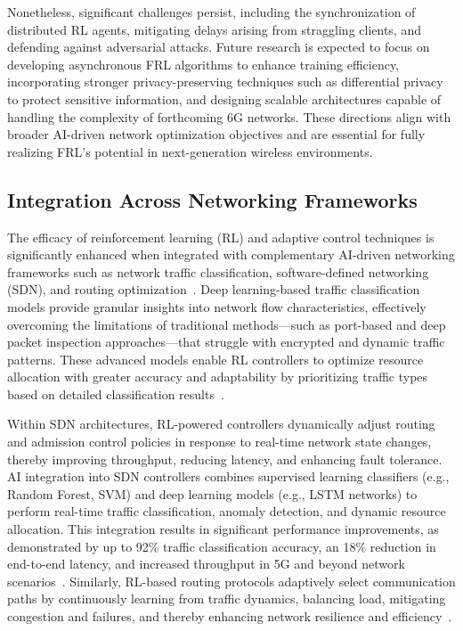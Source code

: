 \documentclass[sigconf]{acmart}
\begin{document}
Nonetheless, significant challenges persist, including the synchronization of distributed RL agents, mitigating delays arising from straggling clients, and defending against adversarial attacks. Future research is expected to focus on developing asynchronous FRL algorithms to enhance training efficiency, incorporating stronger privacy-preserving techniques such as differential privacy to protect sensitive information, and designing scalable architectures capable of handling the complexity of forthcoming 6G networks. These directions align with broader AI-driven network optimization objectives and are essential for fully realizing FRL’s potential in next-generation wireless environments.

\subsection{Integration Across Networking Frameworks}

The efficacy of reinforcement learning (RL) and adaptive control techniques is significantly enhanced when integrated with complementary AI-driven networking frameworks such as network traffic classification, software-defined networking (SDN), and routing optimization~\cite{ref51,ref52,ref53}. Deep learning-based traffic classification models provide granular insights into network flow characteristics, effectively overcoming the limitations of traditional methods—such as port-based and deep packet inspection approaches—that struggle with encrypted and dynamic traffic patterns. These advanced models enable RL controllers to optimize resource allocation with greater accuracy and adaptability by prioritizing traffic types based on detailed classification results~\cite{ref51}.

Within SDN architectures, RL-powered controllers dynamically adjust routing and admission control policies in response to real-time network state changes, thereby improving throughput, reducing latency, and enhancing fault tolerance. AI integration into SDN controllers combines supervised learning classifiers (e.g., Random Forest, SVM) and deep learning models (e.g., LSTM networks) to perform real-time traffic classification, anomaly detection, and dynamic resource allocation. This integration results in significant performance improvements, as demonstrated by up to 92\% traffic classification accuracy, an 18\% reduction in end-to-end latency, and increased throughput in 5G and beyond network scenarios~\cite{ref52}. Similarly, RL-based routing protocols adaptively select communication paths by continuously learning from traffic dynamics, balancing load, mitigating congestion and failures, and thereby enhancing network resilience and efficiency~\cite{ref53}.
\end{document}
